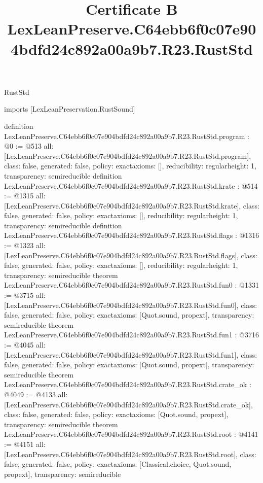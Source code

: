 \begin{lexlean}{RustStd}
\title{Certificate B LexLeanPreserve.C64ebb6f0c07e904bdfd24c892a00a9b7.R23.RustStd}
\begin{coremodule}
imports [LexLeanPreservation.RustSound]

definition LexLeanPreserve.C64ebb6f0c07e904bdfd24c892a00a9b7.R23.RustStd.program : @0 := @513 {
  all: [LexLeanPreserve.C64ebb6f0c07e904bdfd24c892a00a9b7.R23.RustStd.program],
  class: false,
  generated: false,
  policy: exact{axioms: []},
  reducibility: regular{height: 1},
  transparency: semireducible
}
definition LexLeanPreserve.C64ebb6f0c07e904bdfd24c892a00a9b7.R23.RustStd.krate : @514 := @1315 {
  all: [LexLeanPreserve.C64ebb6f0c07e904bdfd24c892a00a9b7.R23.RustStd.krate],
  class: false,
  generated: false,
  policy: exact{axioms: []},
  reducibility: regular{height: 1},
  transparency: semireducible
}
definition LexLeanPreserve.C64ebb6f0c07e904bdfd24c892a00a9b7.R23.RustStd.flags : @1316 := @1323 {
  all: [LexLeanPreserve.C64ebb6f0c07e904bdfd24c892a00a9b7.R23.RustStd.flags],
  class: false,
  generated: false,
  policy: exact{axioms: []},
  reducibility: regular{height: 1},
  transparency: semireducible
}
theorem LexLeanPreserve.C64ebb6f0c07e904bdfd24c892a00a9b7.R23.RustStd.fun0 : @1331 := @3715 {
  all: [LexLeanPreserve.C64ebb6f0c07e904bdfd24c892a00a9b7.R23.RustStd.fun0],
  class: false,
  generated: false,
  policy: exact{axioms: [Quot.sound, propext]},
  transparency: semireducible
}
theorem LexLeanPreserve.C64ebb6f0c07e904bdfd24c892a00a9b7.R23.RustStd.fun1 : @3716 := @4045 {
  all: [LexLeanPreserve.C64ebb6f0c07e904bdfd24c892a00a9b7.R23.RustStd.fun1],
  class: false,
  generated: false,
  policy: exact{axioms: [Quot.sound, propext]},
  transparency: semireducible
}
theorem LexLeanPreserve.C64ebb6f0c07e904bdfd24c892a00a9b7.R23.RustStd.crate_ok : @4049 := @4133 {
  all: [LexLeanPreserve.C64ebb6f0c07e904bdfd24c892a00a9b7.R23.RustStd.crate_ok],
  class: false,
  generated: false,
  policy: exact{axioms: [Quot.sound, propext]},
  transparency: semireducible
}
theorem LexLeanPreserve.C64ebb6f0c07e904bdfd24c892a00a9b7.R23.RustStd.root : @4141 := @4151 {
  all: [LexLeanPreserve.C64ebb6f0c07e904bdfd24c892a00a9b7.R23.RustStd.root],
  class: false,
  generated: false,
  policy: exact{axioms: [Classical.choice, Quot.sound, propext]},
  transparency: semireducible
}


\end{coremodule}
\end{lexlean}
